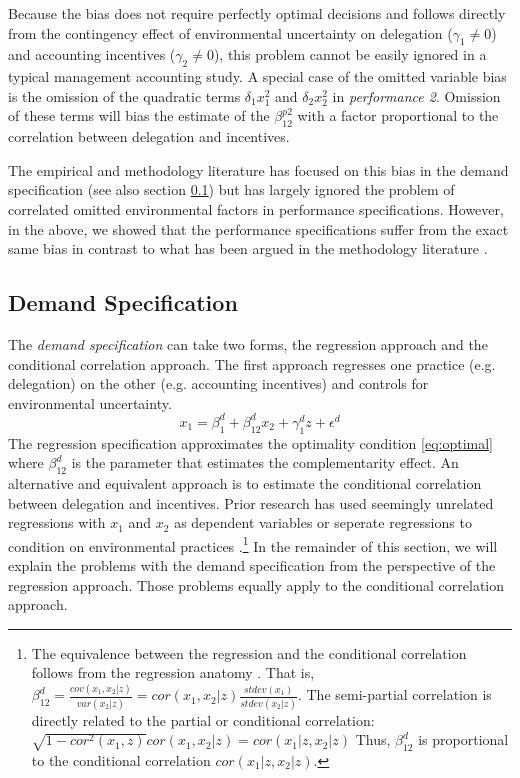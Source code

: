 \documentclass[12pt]{article}
\begin{document}
Because the bias does not require perfectly optimal decisions and follows directly from the contingency effect of environmental uncertainty on delegation ($\gamma_1 \neq 0$) and accounting incentives ($\gamma_2 \neq 0$), this problem cannot be easily ignored in a typical management accounting study. A special case of the omitted variable bias is the omission of the quadratic terms $\delta_1 x_1^2$ and $\delta_2 x_2^2$ in \emph{performance 2}. Omission of these terms will bias the estimate of the $\beta^{p2}_{12}$ with a factor proportional to the correlation between delegation and incentives.

The empirical and methodology literature has focused on this bias in the demand specification (see also section \ref{demand-specification}) but has largely ignored the problem of correlated omitted environmental factors in performance specifications. However, in the above, we showed that the performance specifications suffer from the exact same bias in contrast to what has been argued in the methodology literature \citep{carree_note_2011}. 

\subsection{Demand Specification}\label{demand-specification}

The \emph{demand specification} can take two forms, the regression approach and the conditional correlation approach. The first approach regresses one practice (e.g. delegation) on the other (e.g. accounting incentives) and controls for environmental uncertainty.
\begin{equation*} 
x_1 = \beta_1^d + \beta_{12}^d x_2 
        + \gamma_{1}^d z
        + \epsilon^d
\end{equation*}
The regression specification approximates the optimality condition \eqref{eq:optimal} where \(\beta^d_{12}\) is the parameter that estimates the complementarity effect. An alternative and equivalent approach is to estimate the conditional correlation between delegation and incentives. Prior research has used seemingly unrelated regressions with $x_1$ and $x_2$ as dependent variables or seperate regressions to condition on environmental practices \citep{indjejikian_accounting_2012, matejka_balancing_2017}.\footnote{The equivalence between the regression and the conditional correlation follows from the regression anatomy \citep{angrist2008mostly}. That is, $\beta^d_{12}=\frac{cov(x_1, x_2|z)}{var (x_2|z)}=cor(x_1, x_2|z)\frac{stdev(x_1)}{stdev (x_2|z)}$. The semi-partial correlation is directly related to the partial or conditional correlation: $\sqrt{1 - cor^2(x_1, z)} cor(x_1, x_2|z) = cor(x_1|z, x_2|z)$
Thus, $\beta^d_{12}$ is proportional to the conditional correlation $cor(x_1|z, x_2|z)$.} In the remainder of this section, we will explain the problems with the demand specification from the perspective of the regression approach. Those problems equally apply to the conditional correlation approach.  
\end{document}
